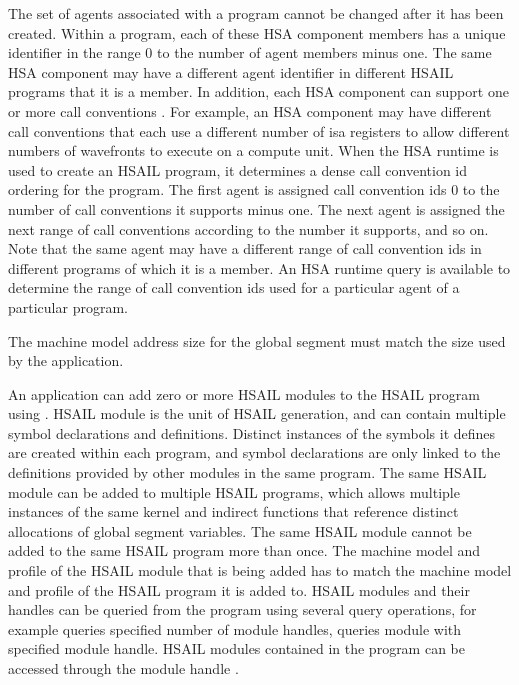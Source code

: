 \documentclass[final]{book}
\begin{document}
The set of agents associated with a program cannot be changed after it has been
created. Within a program, each of these HSA component members has a unique
identifier  in the range 0 to the number
of agent members minus one. The same HSA component may have a different
agent identifier in different HSAIL programs that it is a member. In addition,
each HSA component can support one or more call conventions
. For example, an HSA
component may have different call conventions that each use a different number of
isa registers to allow different numbers of wavefronts to execute on a compute unit.
When the HSA runtime is used to create an HSAIL program, it determines
a dense call convention id ordering for the program. The first agent is
assigned call convention ids 0 to the number of call conventions it supports minus one.
The next agent is assigned the next range of call conventions according to the number
it supports, and so on. Note that the same agent may have a different range of call
convention ids in different programs of which it is a member. An HSA runtime
query  is available to determine the
range of call convention ids used for a particular agent of a particular program.

The machine model address size for the global segment must match the size used by the
application.

An application can add zero or more HSAIL modules  to
the HSAIL program using . HSAIL module is the unit of
HSAIL generation, and can contain multiple symbol declarations and definitions. Distinct
instances of the symbols it defines are created within each program, and symbol
declarations are only linked to the definitions provided by other modules in
the same program. The same HSAIL module can be added to multiple HSAIL
programs, which allows multiple instances of the same kernel and indirect
functions that reference distinct allocations of global segment variables.
The same HSAIL module cannot be added to the same HSAIL program more than
once. The machine model and profile of the HSAIL module that is being added
has to match the machine model and profile of the HSAIL program it is
added to. HSAIL modules and their handles can be queried from the program
using several query operations, for example  queries
specified number of module handles,  queries
module with specified module handle. HSAIL modules contained in
the program can be accessed through the module handle .
\end{document}
